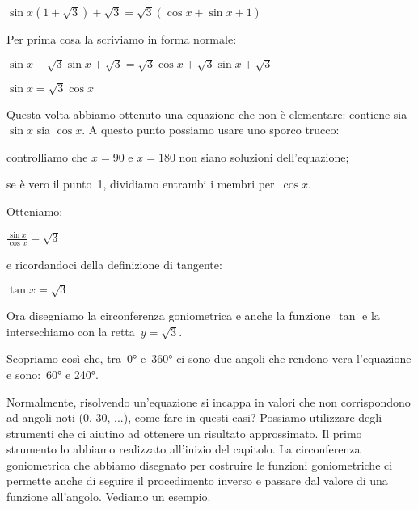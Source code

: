  \begin{esempio}
  $\sin x (1 + \sqrt{3}) + \sqrt{3} = \sqrt{3}(\cos x + \sin x +1)$
  
  Per prima cosa la scriviamo in forma normale:
  
  $\sin x + \sqrt{3} \sin x + \sqrt{3} = 
   \sqrt{3} \cos x + \sqrt{3} \sin x + \sqrt{3}$
   
  $\sin x  = \sqrt{3} \cos x $
  
 Questa volta abbiamo ottenuto una equazione che non è elementare: 
  contiene sia $\sin x$ sia $\cos x$.
  A questo punto possiamo usare uno sporco trucco:
  
 \begin{minipage}{.50\textwidth}
  \begin{center}
\begin{inaccessibleblock}[Soluzione grafica dell'equazione: 
    $\tan x = \sqrt{3}$.]
    
\end{inaccessibleblock}
  \end{center}
 \end{minipage}
 \begin{minipage}{.48\textwidth}
  \begin{enumerate*}
   \item controlliamo che $x = 90$ e $x = 180$ non siano soluzioni 
    dell'equazione;
   \item se è vero il punto~1, dividiamo entrambi i membri per~$\cos x$.
  \end{enumerate*}
  Otteniamo:

  $\frac{\sin x}{\cos x} = \sqrt{3}$
  
  e ricordandoci della definizione di tangente:

  $\tan x = \sqrt{3}$
  
  Ora disegniamo la circonferenza goniometrica e anche la funzione~$\tan$ 
  e la intersechiamo con la retta~$y=\sqrt{3}$.
  
  Scopriamo così che, tra~0° e~360° ci sono due angoli che rendono vera 
  l'equazione e sono:~60° e 240°. 
 \end{minipage}
 \end{esempio}


 Normalmente, risolvendo un'equazione si incappa in valori che non 
 corrispondono ad angoli noti (0\grado, 30\grado, ...), come fare in questi 
 casi? Possiamo utilizzare degli strumenti che ci aiutino ad ottenere un 
 risultato approssimato. Il primo strumento lo abbiamo realizzato all'inizio 
 del capitolo. La circonferenza goniometrica che abbiamo disegnato per 
 costruire le funzioni goniometriche ci permette anche di seguire il 
 procedimento inverso e passare dal valore di una funzione all'angolo. 
 Vediamo un esempio.
 
